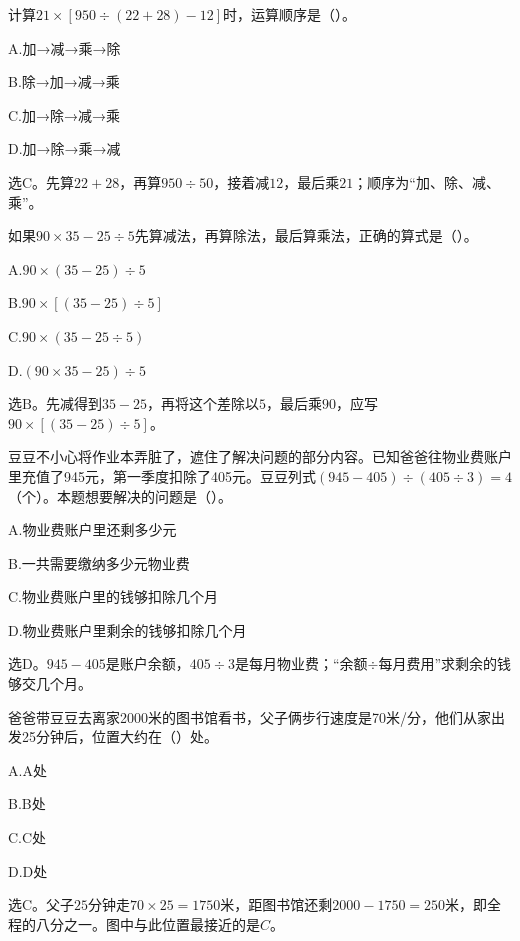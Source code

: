 计算\(21\times[950\div(22+28)-12]\)时，运算顺序是（\hspace{1.8em}）。\par
\noindent A.加→减→乘→除\par
\noindent B.除→加→减→乘\par
\noindent C.加→除→减→乘\par
\noindent D.加→除→乘→减\par
\begin{BookAnswer}
选\(\mathrm C\)。先算\(22+28\)，再算\(950\div50\)，接着减\(12\)，最后乘\(21\)；顺序为“加、除、减、乘”。
\end{BookAnswer}

如果\(90\times35-25\div5\)先算减法，再算除法，最后算乘法，正确的算式是（\hspace{1.8em}）。\par
\noindent A.\(90\times(35-25)\div5\)\par
\noindent B.\(90\times[(35-25)\div5]\)\par
\noindent C.\(90\times(35-25\div5)\)\par
\noindent D.\((90\times35-25)\div5\)\par
\begin{BookAnswer}
选\(\mathrm B\)。先减得到\(35-25\)，再将这个差除以\(5\)，最后乘\(90\)，应写\(90\times[(35-25)\div5]\)。
\end{BookAnswer}

豆豆不小心将作业本弄脏了，遮住了解决问题的部分内容。已知爸爸往物业费账户里充值了945元，第一季度扣除了405元。豆豆列式\((945-405)\div(405\div3)=4\)（个）。本题想要解决的问题是（\hspace{1.8em}）。\par
\noindent A.物业费账户里还剩多少元\par
\noindent B.一共需要缴纳多少元物业费\par
\noindent C.物业费账户里的钱够扣除几个月\par
\noindent D.物业费账户里剩余的钱够扣除几个月\par
\begin{BookAnswer}
选\(\mathrm D\)。\(945-405\)是账户余额，\allowbreak{}\(405\div3\)是每月物业费；“余额\(\div\)每月费用”求剩余的钱够交几个月。
\end{BookAnswer}

爸爸带豆豆去离家2000米的图书馆看书，父子俩步行速度是70米/分，他们从家出发25分钟后，位置大约在（\hspace{1.8em}）处。\par
\noindent A.A处\par
\noindent B.B处\par
\noindent C.C处\par
\noindent D.D处\par
{}
\begin{BookAnswer}
选\(\mathrm C\)。父子\(25\)分钟走\(70\times25=1750\)米，距图书馆还剩\(2000-1750=250\)米，即全程的八分之一。图中与此位置最接近的是\(C\)。
\end{BookAnswer}

